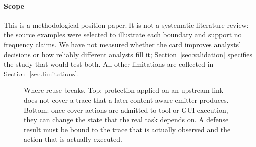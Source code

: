 \paragraph{Scope}
This is a methodological position paper. It is not a systematic literature review: the source examples were selected to illustrate each boundary and support no frequency claims. We have not measured whether the card improves analysts' decisions or how reliably different analysts fill it; Section~\ref{sec:validation} specifies the study that would test both. All other limitations are collected in Section~\ref{sec:limitations}.

\begin{figure}[t]\centering
\caption{Where reuse breaks. Top: protection applied on an upstream link does not cover a trace that a later content-aware emitter produces. Bottom: once cover actions are admitted to tool or GUI execution, they can change the state that the real task depends on. A defense result must be bound to the trace that is actually observed and the action that is actually executed.}\label{fig:system-model}\end{figure}
